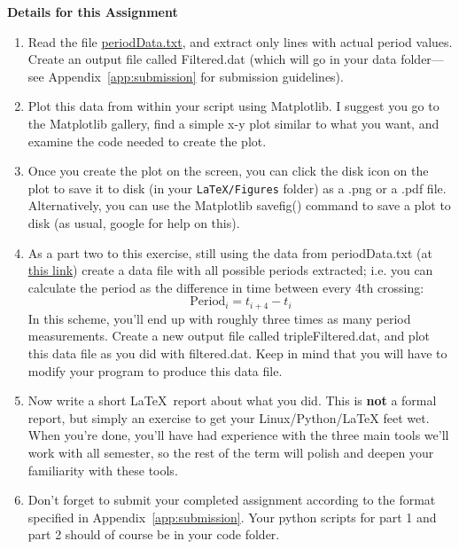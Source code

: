 \begin{prob}
\textbf{Details for this Assignment }\\
\begin{enumerate}
	\item Read the file \href{http://media.usm.maine.edu/~pauln/dataFiles/periodData.txt}{periodData.txt}, and extract only lines with actual period values. Create an output file called {\textsf Filtered.dat} (which will go in your data folder---see Appendix~\ref{app:submission} for submission guidelines). 
	\item Plot this data from within your script using Matplotlib. I suggest you go to the Matplotlib gallery, find a simple x-y plot similar to what you want, and examine the code needed to create the plot.
	\item Once you create the plot on the screen, you can click the disk icon on the plot to save it to disk (in your \verb&LaTeX/Figures& folder) as a .png or a .pdf file. Alternatively, you can use the Matplotlib savefig() command to save a plot to disk (as usual, google for help on this).
	\item As a part two to this exercise, still using the data from periodData.txt (at \href{http://media.usm.maine.edu/~pauln/dataFiles/periodData.txt}{this link}) create a data file with all possible periods extracted; i.e. you can calculate the period as the difference in time between every 4th crossing:
	$$ \mathrm{Period}_i = t_{i+4} - t_i$$
In this scheme, you'll end up with roughly three times as many period measurements. Create a new output file called \textsf{tripleFiltered.dat}, and plot this data file as you did with \textsf{filtered.dat}. Keep in mind that you will have to modify your program to produce this data file. 
	\item Now write a short \LaTeX\ report about what you did. This is \textbf{not}
	a formal report, but simply an exercise to get your Linux/Python/LaTeX feet wet. When you're done, you'll have had experience with the three main tools we'll work with all semester, so the rest of the term will polish and deepen your familiarity with these tools.
	\item Don't forget to submit your completed assignment according to the format specified in Appendix~\ref{app:submission}. Your python scripts for part 1 and part 2 should of course be in your code folder.  
\end{enumerate}

\end{prob}

